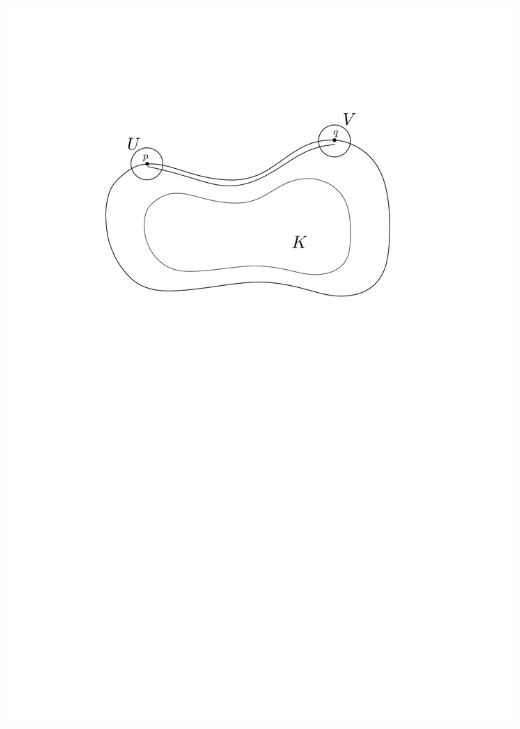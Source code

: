 \begin{frame}[t]
{    \includegraphics[width=1.05\textwidth, trim=0 18cm 0 3cm]{nonvis5.png}
  }
\end{frame}
